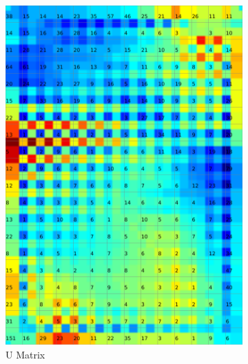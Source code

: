 \documentclass{acm_proc_article-sp}
\begin{document}
\begin{figure}
\centering
    \centering
    \begin{subfigure}[b]{0.45\linewidth}
        \includegraphics[width=\linewidth]{img/wine-weird-u-matrix}
        \caption{U Matrix}
        \label{fig:wine-weird-u-matrix}
    \end{subfigure}
    \begin{subfigure}[b]{0.45\linewidth}

\end{subfigure}
\end{figure}
\end{document}
